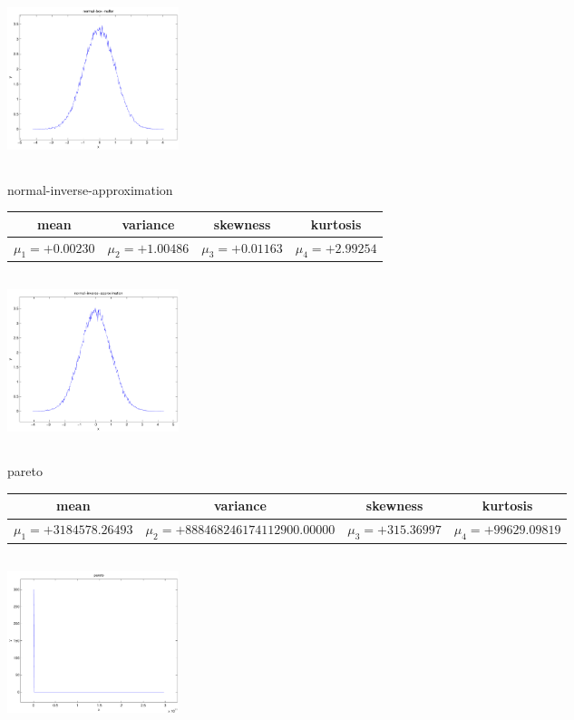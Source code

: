 \documentclass[9pt]{article}
\theoremstyle{plain}
\theoremstyle{definition}
\theoremstyle{remark}
\numberwithin{equation}{section}
\begin{document}
\includegraphics[width=5cm,height=5cm]{normal-box-muller.pdf}

\newpage
normal-inverse-approximation \begin{tabular}{|c|c|c|c|}  mean & variance & skewness & kurtosis \\  \hline
$\mu_1 = +0.00230$ & $\mu_2 = +1.00486$ & $\mu_3 = +0.01163$ & $\mu_4 =+2.99254$ \\
\end{tabular}

\includegraphics[width=5cm,height=5cm]{normal-inverse-approximation.pdf}

pareto \begin{tabular}{|c|c|c|c|}  mean & variance & skewness & kurtosis \\  \hline
$\mu_1 = +3184578.26493$ & $\mu_2 = +888468246174112900.00000$ & $\mu_3 = +315.36997$ & $\mu_4 =+99629.09819$ \\
\end{tabular}

\includegraphics[width=5cm,height=5cm]{pareto.pdf}
\end{document}
